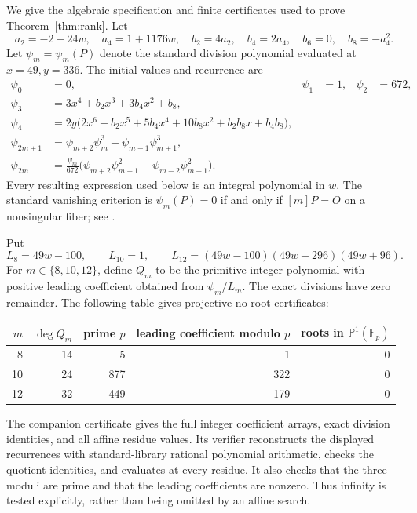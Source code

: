 \documentclass[11pt,a4paper]{article}
\begin{document}
We give the algebraic specification and finite certificates used to
prove Theorem~\ref{thm:rank}. Let
\[
 a_2=-2-24w,\quad a_4=1+1176w,\quad
 b_2=4a_2,\quad b_4=2a_4,\quad b_6=0,\quad b_8=-a_4^2.
\]
Let \(\psi_m=\psi_m(P)\) denote the standard division polynomial
evaluated at \(x=49,y=336\). The initial values and recurrence are
\begin{align*}
 \psi_0&=0,&\psi_1&=1,&\psi_2&=672,\\
 \psi_3&=3x^4+b_2x^3+3b_4x^2+b_8,\\
 \psi_4&=2y\bigl(2x^6+b_2x^5+5b_4x^4
                       +10b_8x^2+b_2b_8x+b_4b_8\bigr),\\
 \psi_{2m+1}&=\psi_{m+2}\psi_m^3-\psi_{m-1}\psi_{m+1}^3,\\
 \psi_{2m}&=\frac{\psi_m}{672}
           \bigl(\psi_{m+2}\psi_{m-1}^2
                         -\psi_{m-2}\psi_{m+1}^2\bigr).
\end{align*}
Every resulting expression used below is an integral polynomial in
\(w\). The standard vanishing criterion is
\(\psi_m(P)=0\) if and only if \([m]P=O\) on a nonsingular
fiber; see \cite[Chapter III, Exercise 3.7]{Silverman}.

Put
\[
 L_8=49w-100,\qquad L_{10}=1,\qquad
 L_{12}=(49w-100)(49w-296)(49w+96).
\]
For \(m\in\{8,10,12\}\), define \(Q_m\) to be the primitive
integer polynomial with positive leading coefficient obtained from
\(\psi_m/L_m\). The exact divisions have zero remainder.
The following table gives projective no-root certificates:
\begin{center}
\begin{tabular}{rrrrr}\toprule
\(m\)&\(\deg Q_m\)&prime \(p\)&leading coefficient modulo \(p\)
  &roots in \(\mathbb P^1(\mathbb F_p)\)\\\midrule
8&14&5&1&0\\
10&24&877&322&0\\
12&32&449&179&0\\\bottomrule
\end{tabular}
\end{center}

The companion certificate \cite{Certificate} gives the full integer
coefficient arrays, exact division identities, and all affine residue
values. Its verifier reconstructs the displayed recurrences with
standard-library rational polynomial arithmetic, checks the quotient
identities, and evaluates at every residue. It also checks that the
three moduli are prime and that the leading coefficients are nonzero.
Thus infinity is tested explicitly, rather than being omitted by an
affine search.
\end{document}
